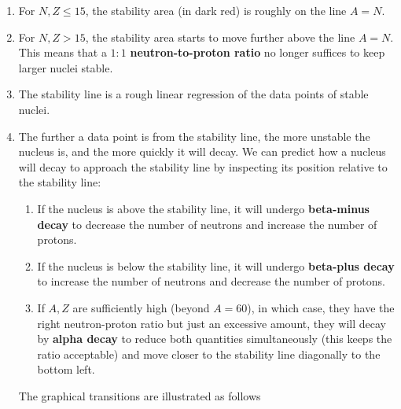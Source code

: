 \documentclass[a4paper,12pt]{article}
\begin{document}
\begin{enumerate}
  \item For $N, Z \le 15$, the stability area (in dark red) is roughly on the line $A = N$.
  \item For $N, Z > 15$, the stability area starts to move further above the line $A = N$. This means that a $1:1$ \textbf{neutron-to-proton ratio} no longer suffices to keep larger nuclei stable.
  \item The stability line is a rough linear regression of the data points of stable nuclei.
  \item The further a data point is from the stability line, the more unstable the nucleus is, and the more quickly it will decay. We can predict how a nucleus will decay to approach the stability line by inspecting its position relative to the stability line:
        \begin{enumerate}
          \item If the nucleus is above the stability line, it will undergo \textbf{beta-minus decay} to decrease the number of neutrons and increase the number of protons.
          \item If the nucleus is below the stability line, it will undergo \textbf{beta-plus decay} to increase the number of neutrons and decrease the number of protons.
          \item If $A, Z$ are sufficiently high (beyond $A = 60$), in which case, they have the right neutron-proton ratio but just an excessive amount, they will decay by \textbf{alpha decay} to reduce both quantities simultaneously (this keeps the ratio acceptable) and move closer to the stability line diagonally to the bottom left.
        \end{enumerate}
        The graphical transitions are illustrated as follows


\end{enumerate}
\end{document}
